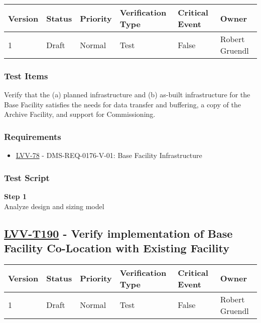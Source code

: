 \begin{longtable}[]{@{}llllll@{}}
\toprule
Version & Status & Priority & Verification Type & Critical Event &
Owner\tabularnewline
\midrule
\endhead
1 & Draft & Normal & Test & False & Robert Gruendl\tabularnewline
\bottomrule
\end{longtable}

\subsubsection{Test Items}\label{test-items-48}

Verify that the (a) planned infrastructure and (b) as-built
infrastructure for the Base Facility satisfies the needs for data
transfer and buffering, a copy of the Archive Facility, and support for
Commissioning.

\subsubsection{Requirements}\label{requirements-48}

\begin{itemize}
\tightlist
\item
  \href{https://jira.lsstcorp.org/browse/LVV-78}{LVV-78} -
  DMS-REQ-0176-V-01: Base Facility Infrastructure
\end{itemize}

\subsubsection{Test Script}\label{test-script-48}

\textbf{Step 1}\\
Analyze design and sizing model\\[2\baselineskip]

\hypertarget{lvv-t190---verify-implementation-of-base-facility-co-location-with-existing-facility}{\subsection{\texorpdfstring{\href{https://jira.lsstcorp.org/secure/Tests.jspa\#/testCase/LVV-T190}{LVV-T190}
- Verify implementation of Base Facility Co-Location with Existing
Facility}{LVV-T190 - Verify implementation of Base Facility Co-Location with Existing Facility}}\label{lvv-t190---verify-implementation-of-base-facility-co-location-with-existing-facility}}

\begin{longtable}[]{@{}llllll@{}}
\toprule
Version & Status & Priority & Verification Type & Critical Event &
Owner\tabularnewline
\midrule
\endhead
1 & Draft & Normal & Test & False & Robert Gruendl\tabularnewline
\bottomrule
\end{longtable}

